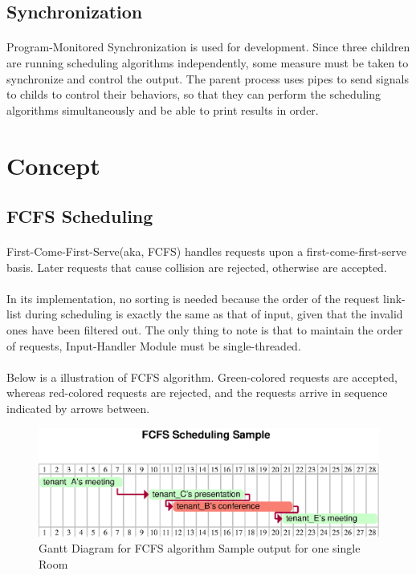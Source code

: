 \documentclass{article}
\begin{document}
        \subsection{Synchronization}
            \paragraph{}
            Program-Monitored Synchronization is used for development. Since three children are running scheduling algorithms independently, some measure must be taken to synchronize and control the output. The parent process uses pipes to send signals to childs to control their behaviors, so that they can perform the scheduling algorithms simultaneously and be able to print results in order.
    \cleardoublepage
    \section{Concept}
        \subsection{FCFS Scheduling}
            \paragraph{}
                First-Come-First-Serve(aka, FCFS) handles requests upon a first-come-first-serve basis. Later requests that cause collision are rejected, otherwise are accepted.
            \paragraph{}
                In its implementation, no sorting is needed because the order of the request link-list during scheduling is exactly the same as that of input, given that the invalid ones have been filtered out. The only thing to note is that to maintain the order of requests, Input-Handler Module must be single-threaded.
            \paragraph{}
                Below is a illustration of FCFS algorithm. Green-colored requests are accepted, whereas red-colored requests are rejected, and the requests arrive in sequence indicated by arrows between. 
            \begin{figure}[!htbp]
                \centering
                \includegraphics[scale=0.7]{../res/eps/fcfs_scheduling.eps}
                \caption{Gantt Diagram for FCFS algorithm Sample output for one single Room}
            \end{figure}
\end{document}
